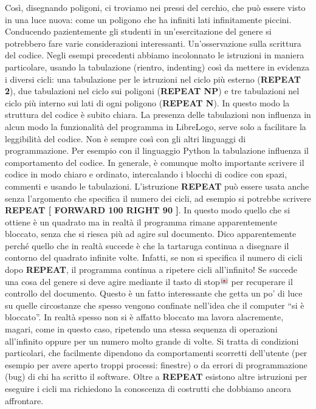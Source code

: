 Così, disegnando poligoni, ci troviamo nei pressi del cerchio, che può essere visto in una luce nuova: come un poligono che ha infiniti lati infinitamente piccini. Conducendo pazientemente gli studenti in un'esercitazione del genere si potrebbero fare varie considerazioni interessanti.
Un'osservazione sulla scrittura del codice. Negli esempi precedenti abbiamo incolonnato le istruzioni in maniera particolare, usando la tabulazione (rientro, indenting) così da mettere in evidenza i diversi cicli:  una tabulazione per le istruzioni nel ciclo più esterno (\textbf{REPEAT 2}), due tabulazioni nel ciclo sui poligoni (\textbf{REPEAT NP}) e tre tabulazioni nel ciclo più interno sui lati di ogni poligono (\textbf{REPEAT N}). In questo modo la struttura del codice è subito chiara. La presenza delle tabulazioni non influenza in alcun modo la funzionalità del programma in LibreLogo, serve solo a facilitare la leggibilità del codice. Non è sempre così con gli altri linguaggi di programmazione. Per esempio con il linguaggio Python la tabulazione influenza il comportamento del codice. In generale, è comunque molto importante scrivere il codice in modo chiaro e ordinato, intercalando i blocchi di codice con spazi, commenti e usando le tabulazioni.
L'istruzione \textbf{REPEAT} può essere usata anche senza l'argomento che specifica il numero dei cicli, ad esempio si potrebbe scrivere \textbf{REPEAT [ FORWARD 100 RIGHT 90 ]}. In questo modo quello che si ottiene è un quadrato ma in realtà il programma rimane apparentemente bloccato, senza che si riesca più ad agire sul documento. Dico apparentemente perché quello che in realtà succede è che la tartaruga continua a disegnare il contorno del quadrato infinite volte. Infatti, se non si specifica il numero di cicli dopo \textbf{REPEAT}, il programma continua a ripetere cicli all'infinito! Se succede una cosa del genere si deve agire mediante il tasto di stop\includegraphics[height=1em]{./images/ripetere/StopLO.png}   per recuperare il controllo del documento. Questo è un fatto interessante che getta un po' di luce su quelle circostanze che spesso vengono confinate nell'idea che il computer “si  è bloccato”. In realtà spesso non si è affatto bloccato ma lavora alacremente, magari, come in questo caso, ripetendo una stessa sequenza di operazioni all'infinito oppure per un numero molto grande di volte. Si tratta di condizioni particolari, che facilmente dipendono da comportamenti scorretti dell'utente (per esempio per avere aperto troppi processi: finestre) o da errori di programmazione (bug) di chi ha scritto il software.
Oltre a \textbf{REPEAT} esistono altre istruzioni per eseguire i cicli ma richiedono la conoscenza di costrutti che dobbiamo ancora affrontare. 

